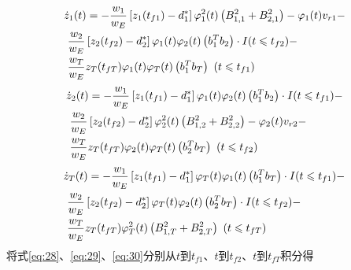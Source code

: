 \begin{equation}
\label{eq:28}
\begin{gathered}
  {{\dot z}_1}(t) =  - \frac{{{w_1}}}{{{w_E}}}\left[ {{z_1}({t_{f1}}) - d_1^*} \right]\varphi _1^2(t)\left( {B_{1,1}^2 + B_{2,1}^2} \right) - {\varphi _1}(t){v_{r1}} -  \hfill \\
  {\text{          }}\frac{{{w_2}}}{{{w_E}}}\left[ {{z_2}({t_{f2}}) - d_2^*} \right]{\varphi _1}(t){\varphi _2}(t)\left( {b_1^T{b_2}} \right) \cdot I(t \leqslant {t_{f2}}) - \quad  \hfill \\
  {\text{          }}\frac{{{w_T}}}{{{w_E}}}{z_T}({t_{fT}}){\varphi _1}(t){\varphi _T}(t)\left( {b_1^T{b_T}} \right){\text{   }}(t \leqslant {t_{f1}}) \hfill \\ 
\end{gathered}
\end{equation}
\begin{equation}
\label{eq:29}
\begin{gathered}
  {{\dot z}_2}(t) =  - \frac{{{w_1}}}{{{w_E}}}\left[ {{z_1}({t_{f1}}) - d_1^*} \right]{\varphi _1}(t){\varphi _2}(t)\left( {b_1^T{b_2}} \right) \cdot I(t \leqslant {t_{f1}}) -  \hfill \\
  {\text{          }}\frac{{{w_2}}}{{{w_E}}}\left[ {{z_2}({t_{f2}}) - d_2^*} \right]\varphi _2^2(t)\left( {B_{1,2}^2 + B_{2,2}^2} \right) - {\varphi _2}(t){v_{r2}} -  \hfill \\
  {\text{          }}\frac{{{w_T}}}{{{w_E}}}{z_T}({t_{fT}}){\varphi _2}(t){\varphi _T}(t)\left( {b_2^T{b_T}} \right){\text{   }}(t \leqslant {t_{f2}}) \hfill \\ 
\end{gathered}
\end{equation}
\begin{equation}
\label{eq:30}
\begin{gathered}
  {{\dot z}_T}(t) =  - \frac{{{w_1}}}{{{w_E}}}\left[ {{z_1}({t_{f1}}) - d_1^*} \right]{\varphi _T}(t){\varphi _1}(t)\left( {b_1^T{b_T}} \right) \cdot I(t \leqslant {t_{f1}}) -  \hfill \\
  {\text{          }}\frac{{{w_2}}}{{{w_E}}}\left[ {{z_2}({t_{f2}}) - d_2^*} \right]{\varphi _T}(t){\varphi _2}(t)\left( {b_2^T{b_T}} \right) \cdot I(t \leqslant {t_{f2}}) - \quad  \hfill \\
  {\text{          }}\frac{{{w_T}}}{{{w_E}}}{z_T}({t_{fT}})\varphi _T^2(t)\left( {B_{1,T}^2 + B_{2,T}^2} \right){\text{   }}(t \leqslant {t_{fT}}) \hfill \\ 
\end{gathered}
\end{equation}
将式\eqref{eq:28}、\eqref{eq:29}、\eqref{eq:30}分别从$t$到${t_{f1}}$、$t$到${t_{f2}}$、$t$到${t_{fT}}$积分得

